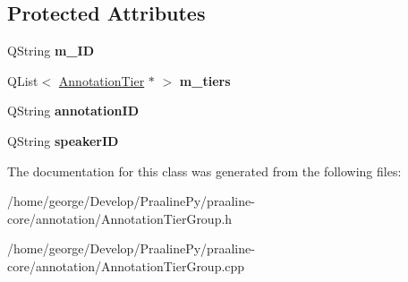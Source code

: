 \subsection*{Protected Attributes}
\begin{DoxyCompactItemize}
\item 
\mbox{\label{class_annotation_tier_group_a4b219b439c4d301bcc6ed814bd7cb868}} 
Q\+String {\bfseries m\+\_\+\+ID}
\item 
\mbox{\label{class_annotation_tier_group_a73d9af796b7cd6c75dc563b702083a50}} 
Q\+List$<$ \hyperlink{class_annotation_tier}{Annotation\+Tier} $\ast$ $>$ {\bfseries m\+\_\+tiers}
\item 
\mbox{\label{class_annotation_tier_group_a8391f2110068e88fbcbfd9da0aa02c67}} 
Q\+String {\bfseries annotation\+ID}
\item 
\mbox{\label{class_annotation_tier_group_a0a25c4f69d95d5a05c4a36b2ce27cf22}} 
Q\+String {\bfseries speaker\+ID}
\end{DoxyCompactItemize}


The documentation for this class was generated from the following files\+:\begin{DoxyCompactItemize}
\item 
/home/george/\+Develop/\+Praaline\+Py/praaline-\/core/annotation/Annotation\+Tier\+Group.\+h\item 
/home/george/\+Develop/\+Praaline\+Py/praaline-\/core/annotation/Annotation\+Tier\+Group.\+cpp\end{DoxyCompactItemize}

